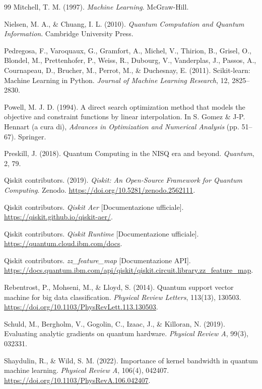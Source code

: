 \begin{thebibliography}{99}
Mitchell, T. M. (1997). \textit{Machine Learning}. McGraw-Hill.

Nielsen, M. A., \& Chuang, I. L. (2010). \textit{Quantum Computation and Quantum Information}. Cambridge University Press.

Pedregosa, F., Varoquaux, G., Gramfort, A., Michel, V., Thirion, B., Grisel, O., Blondel, M., Prettenhofer, P., Weiss, R., Dubourg, V., Vanderplas, J., Passos, A., Cournapeau, D., Brucher, M., Perrot, M., \& Duchesnay, E. (2011). Scikit-learn: Machine Learning in Python. \textit{Journal of Machine Learning Research}, 12, 2825--2830.

Powell, M. J. D. (1994). A direct search optimization method that models the objective and constraint functions by linear interpolation. In S. Gomez \& J-P. Hennart (a cura di), \textit{Advances in Optimization and Numerical Analysis} (pp. 51--67). Springer.

Preskill, J. (2018). Quantum Computing in the NISQ era and beyond. \textit{Quantum}, 2, 79.

Qiskit contributors. (2019). \textit{Qiskit: An Open-Source Framework for Quantum Computing}. Zenodo. \url{https://doi.org/10.5281/zenodo.2562111}.

Qiskit contributors. \textit{Qiskit Aer} [Documentazione ufficiale]. \url{https://qiskit.github.io/qiskit-aer/}.

Qiskit contributors. \textit{Qiskit Runtime} [Documentazione ufficiale]. \url{https://quantum.cloud.ibm.com/docs}.

Qiskit contributors. \textit{zz\_feature\_map} [Documentazione API]. \url{https://docs.quantum.ibm.com/api/qiskit/qiskit.circuit.library.zz_feature_map}.

Rebentrost, P., Mohseni, M., \& Lloyd, S. (2014). Quantum support vector machine for big data classification. \textit{Physical Review Letters}, 113(13), 130503. \url{https://doi.org/10.1103/PhysRevLett.113.130503}.

Schuld, M., Bergholm, V., Gogolin, C., Izaac, J., \& Killoran, N. (2019). Evaluating analytic gradients on quantum hardware. \textit{Physical Review A}, 99(3), 032331.

Shaydulin, R., \& Wild, S. M. (2022). Importance of kernel bandwidth in quantum machine learning. \textit{Physical Review A}, 106(4), 042407. \url{https://doi.org/10.1103/PhysRevA.106.042407}.


\end{thebibliography}
